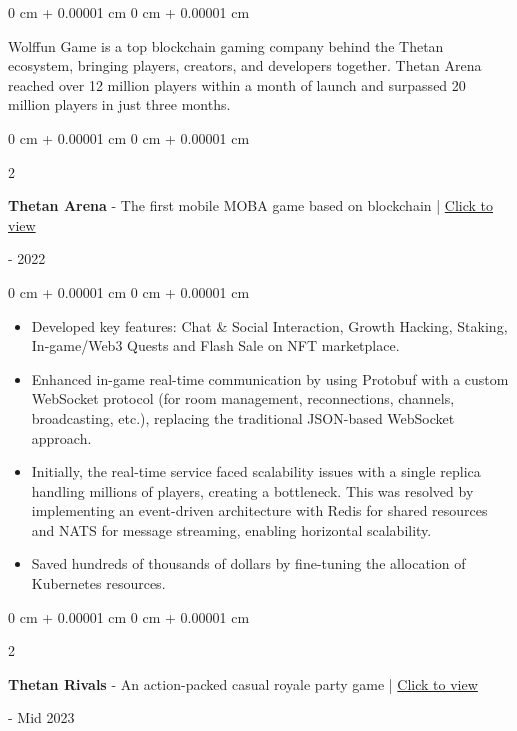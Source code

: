 \documentclass[10pt, letterpaper]{article}
\newenvironment{highlights}{
    \begin{itemize}[
        topsep=0.10 cm,
        parsep=0.10 cm,
        partopsep=0pt,
        itemsep=0pt,
        leftmargin=0 cm + 10pt
    ]
}{
    \end{itemize}
} %
\newenvironment{onecolentry}{
    \begin{adjustwidth}{
        0 cm + 0.00001 cm
    }{
        0 cm + 0.00001 cm
    }
}{
    \end{adjustwidth}
} %
\newenvironment{twocolentry}[2][]{
    \onecolentry
    \def\secondColumn{#2}
    \setcolumnwidth{\fill, 4.5 cm}
    \begin{paracol}{2}
}{
    \switchcolumn \raggedleft \secondColumn
    \end{paracol}
    \endonecolentry
} %
\begin{document}
    \vspace{0.10 cm}
    \begin{onecolentry}
        Wolffun Game is a top blockchain gaming company behind the Thetan ecosystem, bringing players, creators, and developers together. Thetan Arena reached over 12 million players within a month of launch and surpassed 20 million players in just three months.
    \end{onecolentry}

    \vspace{0.20 cm}
    \begin{twocolentry}{
        2021 - 2022
    }
        \textbf{Thetan Arena} - The first mobile MOBA game based on blockchain | \href{https://thetanarena.com}{Click to view}
    \end{twocolentry}

    \vspace{0.10 cm}
    \begin{onecolentry}
        \begin{highlights}
            \item Developed key features: Chat \& Social Interaction, Growth Hacking, Staking, In-game/Web3 Quests and Flash Sale on NFT marketplace.
            \item Enhanced in-game real-time communication by using Protobuf with a custom WebSocket protocol (for room management, reconnections, channels, broadcasting, etc.), replacing the traditional JSON-based WebSocket approach.
            \item Initially, the real-time service faced scalability issues with a single replica handling millions of players, creating a bottleneck. This was resolved by implementing an event-driven architecture with Redis for shared resources and NATS for message streaming, enabling horizontal scalability.
            \item Saved hundreds of thousands of dollars by fine-tuning the allocation of Kubernetes resources.
        \end{highlights}
    \end{onecolentry}

    \vspace{0.20 cm}
    \begin{twocolentry}{
        2022 - Mid 2023
    }
        \textbf{Thetan Rivals} - An action-packed casual royale party game | \href{https://thetanrivals.com}{Click to view}
    \end{twocolentry}
\end{document}
